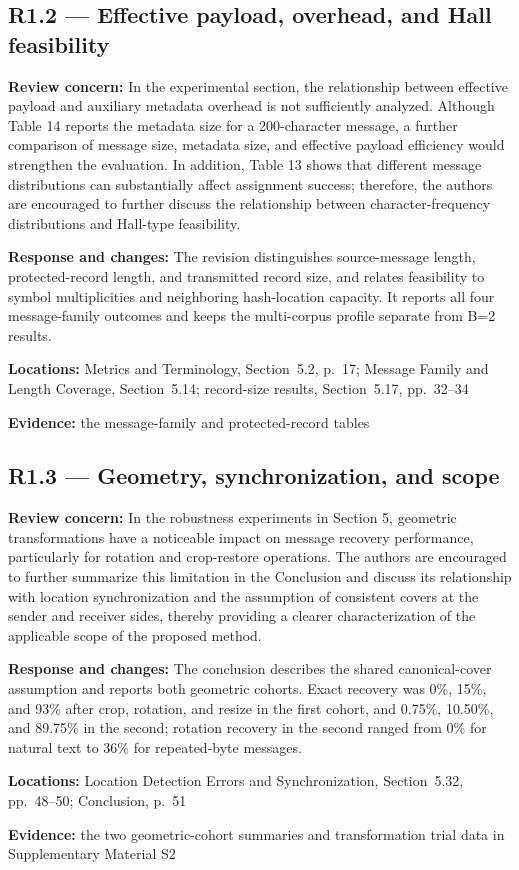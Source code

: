 \documentclass[12pt,a4paper]{article}
\newcommand{\revcomment}[1]{\par\medskip\noindent\textbf{Review concern:} #1\par\smallskip}
\newcommand{\responsechanges}[1]{\par\noindent\textbf{Response and changes:} #1\par}
\newcommand{\locations}[1]{\par\noindent\textbf{Locations:} #1\par}
\newcommand{\evidence}[1]{\par\noindent\textbf{Evidence:} #1\par\smallskip}
\begin{document}
\subsection*{R1.2 --- Effective payload, overhead, and Hall feasibility}

\revcomment{In the experimental section, the relationship between effective payload and auxiliary metadata overhead is not sufficiently analyzed. Although Table 14 reports the metadata size for a 200-character message, a further comparison of message size, metadata size, and effective payload efficiency would strengthen the evaluation. In addition, Table 13 shows that different message distributions can substantially affect assignment success; therefore, the authors are encouraged to further discuss the relationship between character-frequency distributions and Hall-type feasibility.}
\responsechanges{The revision distinguishes source-message length, protected-record length, and transmitted record size, and relates feasibility to symbol multiplicities and neighboring hash-location capacity. It reports all four message-family outcomes and keeps the multi-corpus profile separate from B=2 results.}
\locations{Metrics and Terminology, Section~5.2, p.~17; Message Family and Length Coverage, Section~5.14; record-size results, Section~5.17, pp.~32--34}
\evidence{the message-family and protected-record tables}

\subsection*{R1.3 --- Geometry, synchronization, and scope}

\revcomment{In the robustness experiments in Section 5, geometric transformations have a noticeable impact on message recovery performance, particularly for rotation and crop-restore operations. The authors are encouraged to further summarize this limitation in the Conclusion and discuss its relationship with location synchronization and the assumption of consistent covers at the sender and receiver sides, thereby providing a clearer characterization of the applicable scope of the proposed method.}
\responsechanges{The conclusion describes the shared canonical-cover assumption and reports both geometric cohorts. Exact recovery was 0\%, 15\%, and 93\% after crop, rotation, and resize in the first cohort, and 0.75\%, 10.50\%, and 89.75\% in the second; rotation recovery in the second ranged from 0\% for natural text to 36\% for repeated-byte messages.}
\locations{Location Detection Errors and Synchronization, Section~5.32, pp.~48--50; Conclusion, p.~51}
\evidence{the two geometric-cohort summaries and transformation trial data in Supplementary Material S2}
\end{document}
